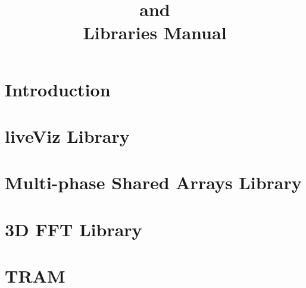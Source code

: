 \documentclass[10pt]{report}
\title{\converse{} and \charmpp{}\\ Libraries Manual}
\begin{document}
\maketitle

\chapter{Introduction}

\chapter{liveViz Library}

\chapter{Multi-phase Shared Arrays Library}

\chapter{3D FFT Library}

\chapter{TRAM}



\end{document}
